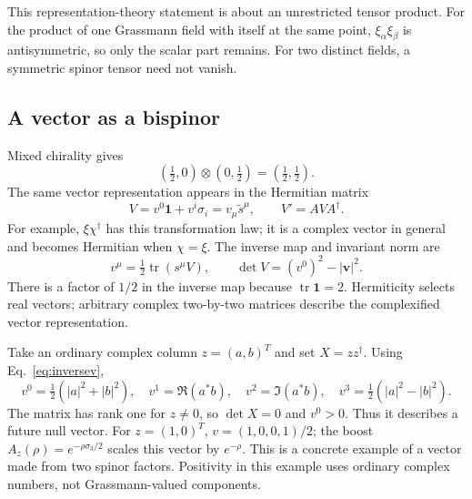 \documentclass[11pt]{article}
\newcommand{\tr}{\operatorname{tr}}
\newcommand{\one}{\mathbf 1}
\begin{document}
This representation-theory statement is about an unrestricted tensor
product. For the product of one Grassmann field with itself at the same
point, \(\xi_\alpha\xi_\beta\) is antisymmetric, so only the scalar
part remains. For two distinct fields, a symmetric spinor tensor need
not vanish.

\subsection{A vector as a bispinor}
Mixed chirality gives
\begin{equation}
 (\tfrac12,0)\otimes(0,\tfrac12)=(\tfrac12,\tfrac12).
 \label{eq:mixed}
\end{equation}
The same vector representation appears in the Hermitian matrix
\begin{equation}
 V=v^0\one+v^i\sigma_i=v_\mu\widetilde s^\mu,
 \qquad V'=A V A^\dagger.
 \label{eq:vmap}
\end{equation}
For example, \(\xi\chi^\dagger\) has this transformation law; it is a
complex vector in general and becomes Hermitian when \(\chi=\xi\).
The inverse map and invariant norm are
\begin{equation}
 v^\mu=\tfrac12\tr(s^\mu V),\qquad
 \det V=(v^0)^2-|\bm v|^2.
 \label{eq:inversev}
\end{equation}
There is a factor of \(1/2\) in the inverse map because
\(\tr\one=2\). Hermiticity selects real vectors; arbitrary complex
two-by-two matrices describe the complexified vector representation.

\begin{remarkbox}
Take an ordinary complex column \(z=(a,b)^T\) and set \(X=zz^\dagger\).
Using Eq.~\eqref{eq:inversev},
\[
 v^0=\tfrac12(|a|^2+|b|^2),\quad
 v^1=\Re(a^*b),\quad v^2=\Im(a^*b),\quad
 v^3=\tfrac12(|a|^2-|b|^2).
\]
The matrix has rank one for \(z\ne0\), so \(\det X=0\) and \(v^0>0\).
Thus it describes a future null vector. For \(z=(1,0)^T\),
\(v=(1,0,0,1)/2\); the boost \(A_z(\rho)=e^{-\rho\sigma_3/2}\) scales this
vector by \(e^{-\rho}\). This is a concrete example of a vector made
from two spinor factors. Positivity in this example uses ordinary
complex numbers, not Grassmann-valued components.
\end{remarkbox}
\end{document}
